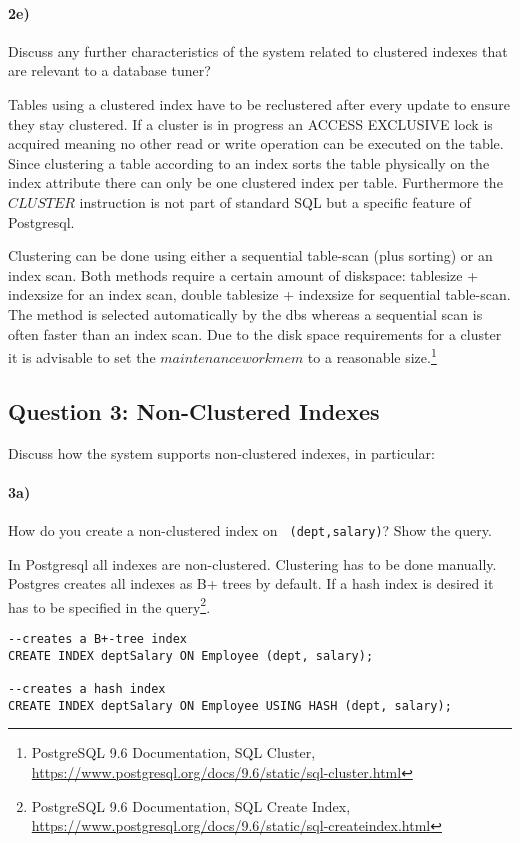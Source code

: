 \documentclass[11pt]{scrartcl}
\begin{document}
\paragraph{2e)} Discuss any further characteristics of the system
related to clustered indexes that are relevant to a database
tuner?

Tables using a clustered index have to be reclustered after every update to ensure they stay clustered.
If a cluster is in progress an ACCESS EXCLUSIVE lock is acquired meaning no other read or write operation can be executed
on the table.
Since clustering a table according to an index sorts the table physically on the index attribute there can only be one clustered index per table.
Furthermore the $CLUSTER$ instruction is not part of standard SQL but a specific feature of Postgresql.

Clustering can be done using either a sequential table-scan (plus sorting) or an index scan. Both methods require a certain amount of diskspace: tablesize + indexsize for an index scan, double tablesize + indexsize for sequential table-scan.
The method is selected automatically by the dbs whereas a sequential scan is often faster than an index scan. Due to the disk space requirements for a cluster it is advisable to set the $maintenance work mem$ to a reasonable size.\footnote{PostgreSQL 9.6
  Documentation, SQL Cluster,
  \url{https://www.postgresql.org/docs/9.6/static/sql-cluster.html}}

\subsection*{Question 3: Non-Clustered Indexes}

Discuss how the system supports non-clustered indexes, in
particular:

\paragraph{3a)} How do you create a non-clustered index on {\tt
  (dept,salary)}? Show the query.

In Postgresql all indexes are non-clustered. Clustering has to be done manually.
Postgres creates all indexes as B+ trees by default. If a hash index is desired it has to be specified in the query\footnote{PostgreSQL 9.6
  Documentation, SQL Create Index,
  \url{https://www.postgresql.org/docs/9.6/static/sql-createindex.html}}.

{\small
\begin{verbatim}
--creates a B+-tree index
CREATE INDEX deptSalary ON Employee (dept, salary);

--creates a hash index
CREATE INDEX deptSalary ON Employee USING HASH (dept, salary);
\end{verbatim}
}
\end{document}

